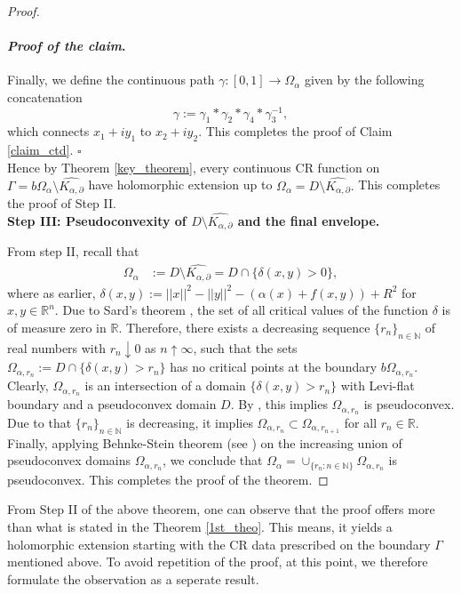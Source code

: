 \documentclass[12pt,reqno, a4paper]{amsart}
\theoremstyle{definition}
\newenvironment{claimproof}{\paragraph{\textit{Proof of the claim}.}}{\hfill$\square$}
\theoremstyle{definition}
\numberwithin{equation}{section}
\def\R{\mathbb{R}}                              %
\def\N{\mathbb{N}}
\begin{document}
\begin{proof}
\begin{claimproof}
Finally, we define the continuous path $\gamma:[0,1]\to \Omega_{\alpha}$ given by the following concatenation $$\gamma:=\gamma_{1}*\gamma_{2}*\gamma_{4}*\gamma^{-1}_{3},$$
which connects $x_1+iy_1$ to $x_2+iy_2$. This completes the proof of Claim \ref{claim_ctd}.
\end{claimproof}\\


Hence by Theorem \ref{key_theorem},  every continuous CR function on $\Gamma =b\Omega_{\alpha}\setminus \widehat{K_{\alpha,\partial}}$ have holomorphic extension up to $\Omega_{\alpha}=D\setminus \widehat{K_{\alpha,\partial}}.$ This completes the proof of Step II.\\


\noindent \textbf{Step III: Pseudoconvexity of $D\setminus \widehat{K_{\alpha,\partial}}$ and the final envelope.}\\

\vspace*{-.3cm} 
 
From step II, recall that \begin{align*}
	\Omega_{\alpha}&:=D\setminus \widehat{K_{\alpha,\partial}}=D \cap \{\delta(x,y)>0\},
\end{align*} 
where as earlier, $\delta(x,y):=||x||^2-||y||^2-(\alpha(x)+f(x,y))+R^2$ for $x,y\in \R^n$. Due to Sard's theorem \cite[Theorem 6.1]{milnor}, the set of all
critical values of the function $\delta$ is of measure zero in $\R$. Therefore, there exists a decreasing sequence $\{r_n\}_{n\in \N}$ of real numbers with $r_n\downarrow 0$ as $n\uparrow \infty$, such that the sets ${\Omega_{\alpha,r_n}:=D\cap \{\delta(x,y)>r_n\}}$ has no critical points at the boundary $b\Omega_{\alpha,r_n}$. Clearly, $\Omega_{\alpha,r_n}$ is an intersection of a domain $\{\delta(x,y)>r_n\}$ with Levi-flat boundary and a pseudoconvex domain $D$. By \cite[Corollary 3.4.7]{kra}, this implies $\Omega_{\alpha,r_n}$ is pseudoconvex. Due to that $\{r_n\}_{n\in \N}$ is decreasing, it implies $\Omega_{\alpha,r_n}\subset \Omega_{\alpha,r_{n+1}}$ for all $r_n\in \R.$ Finally, applying {Behnke-Stein} theorem (see \cite{beh-ste}) on the increasing union of pseudoconvex domains $\Omega_{\alpha,r_n}$, we conclude that $\Omega_{\alpha}=\cup_{\{r_n:n\in \N\}}\Omega_{\alpha,r_n}$ is pseudoconvex. This completes the proof of the theorem.
\end{proof}

From Step II of the above theorem, one can observe that the proof offers more than what is stated in the Theorem \ref{1st_theo}. This means, it yields a holomorphic extension starting with the CR data prescribed on the boundary $\Gamma$ mentioned above. To avoid repetition of the proof, at this point, we therefore formulate the observation as a seperate result.
\end{document}
